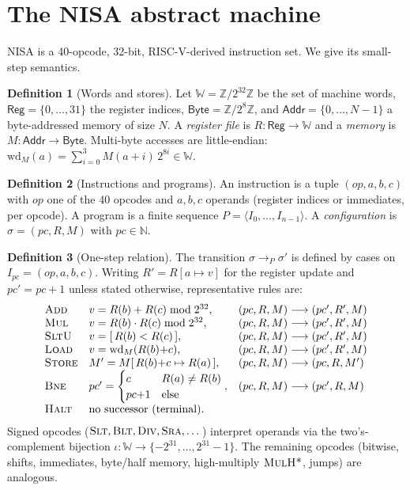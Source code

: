 \documentclass[11pt]{article}
\theoremstyle{definition}
\newtheorem{definition}{Definition}
\theoremstyle{plain}
\theoremstyle{remark}
\newcommand{\Word}{\mathbb{W}}
\newcommand{\Reg}{\mathsf{Reg}}
\newcommand{\Addr}{\mathsf{Addr}}
\newcommand{\Byte}{\mathsf{Byte}}
\newcommand{\step}{\longrightarrow}
\newcommand{\N}{\mathbb{N}}
\newcommand{\Z}{\mathbb{Z}}
\begin{document}
\section{The NISA abstract machine}\label{sec:nisa}

NISA is a 40-opcode, 32-bit, RISC-V-derived instruction set. We give its small-step semantics.

\begin{definition}[Words and stores]
Let $\Word = \Z/2^{32}\Z$ be the set of machine words, $\Reg = \{0,\dots,31\}$ the register indices,
$\Byte = \Z/2^{8}\Z$, and $\Addr = \{0,\dots,N-1\}$ a byte-addressed memory of size $N$. A
\emph{register file} is $R : \Reg \to \Word$ and a \emph{memory} is $M : \Addr \to \Byte$. Multi-byte
accesses are little-endian: $\mathrm{wd}_M(a) = \sum_{i=0}^{3} M(a{+}i)\,2^{8i} \in \Word$.
\end{definition}

\begin{definition}[Instructions and programs]
An instruction is a tuple $(\mathit{op}, a, b, c)$ with $\mathit{op}$ one of the 40 opcodes and
$a,b,c$ operands (register indices or immediates, per opcode). A program is a finite sequence
$P = \langle I_0, \dots, I_{n-1}\rangle$. A \emph{configuration} is $\sigma = (pc, R, M)$ with
$pc \in \N$.
\end{definition}

\begin{definition}[One-step relation]\label{def:step}
The transition $\sigma \step_P \sigma'$ is defined by cases on $I_{pc} = (\mathit{op},a,b,c)$. Writing
$R'=R[a \mapsto v]$ for the register update and $pc'=pc{+}1$ unless stated otherwise, representative
rules are:
\[
\begin{array}{llll}
\textsc{Add}   & v = R(b) + R(c) \bmod 2^{32}, & (pc,R,M)\step(pc',R',M) \\
\textsc{Mul}   & v = R(b)\cdot R(c) \bmod 2^{32}, & (pc,R,M)\step(pc',R',M) \\
\textsc{SltU}  & v = [\,R(b) < R(c)\,],          & (pc,R,M)\step(pc',R',M) \\
\textsc{Load}  & v = \mathrm{wd}_M(R(b){+}c),     & (pc,R,M)\step(pc',R',M) \\
\textsc{Store} & M' = M[\,R(b){+}c \mapsto R(a)\,], & (pc,R,M)\step(pc,R,M') \\
\textsc{Bne}   & pc' = \begin{cases} c & R(a)\neq R(b)\\ pc{+}1 & \text{else}\end{cases}, & (pc,R,M)\step(pc',R,M)\\
\textsc{Halt}  & \multicolumn{2}{l}{\text{no successor (terminal).}}
\end{array}
\]
Signed opcodes ($\textsc{Slt}, \textsc{Blt}, \textsc{Div}, \textsc{Sra}, \dots$) interpret operands via
the two's-complement bijection $\iota:\Word\to\{-2^{31},\dots,2^{31}{-}1\}$. The remaining opcodes
(bitwise, shifts, immediates, byte/half memory, high-multiply $\textsc{MulH*}$, jumps) are analogous.
\end{definition}
\end{document}
